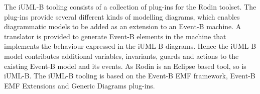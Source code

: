 


The iUML-B tooling consists of a collection of plug-ins for the Rodin toolset. 
The plug-ins provide several different kinds of modelling diagrams, which enables diagrammatic models to be added as an extension to an Event-B machine. 
A translator is provided to generate Event-B elements in the machine that implements the behaviour expressed in the iUML-B diagrams. 
Hence the iUML-B model contributes additional variables, invariants, guards and actions to the existing Event-B model and its events.
As Rodin is an Eclipse based tool, so is iUML-B. 
The iUML-B  tooling is based on the Event-B EMF framework, Event-B EMF Extensions and Generic Diagrams plug-ins.
